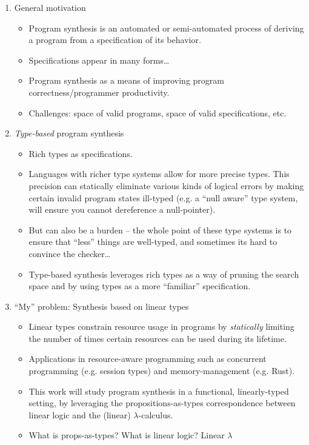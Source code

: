 \documentclass{llncs}
\begin{document}
\begin{enumerate}
\item General motivation
  \begin{itemize}
\item Program synthesis is an automated or semi-automated process of
  deriving a program from a specification of its behavior.
\item Specifications appear in many forms\dots
\item Program synthesis as a means of improving program
  correctness/programmer productivity.
\item Challenges: space of valid programs, space of valid
  specifications,  etc.
\end{itemize}
\item \emph{Type-based} program synthesis
  \begin{itemize}
 \item Rich types as specifications.
\item Languages with richer type systems allow for more precise
  types. This precision can statically eliminate various kinds of
  logical errors by making certain invalid program states ill-typed
  (e.g. a ``null aware'' type system, will ensure you cannot
  dereference a null-pointer).
\item But can also be a burden -- the whole point of these type
  systems is to ensure that ``less'' things are well-typed, and
  sometimes its hard to convince the checker\dots
\item Type-based synthesis leverages rich types as a way of pruning
  the search space and by using types as a more ``familiar''
  specification.
\end{itemize}
\item ``My'' problem: Synthesis based on linear types
  \begin{itemize}
  \item Linear types constrain resource usage in programs by \emph{statically} limiting
    the number of times certain resources can be used during its
    lifetime.
  \item Applications in resource-aware programming such as concurrent
    programming (e.g. session types) and memory-management
    (e.g. Rust).
  \item This work will study program synthesis in a functional,
    linearly-typed setting, by leveraging the propositions-as-types
    correspondence between linear logic and the (linear)
    $\lambda$-calculus.
  \item What is props-as-types? What is linear logic? Linear $\lambda$

\end{itemize}
\end{enumerate}
\end{document}
